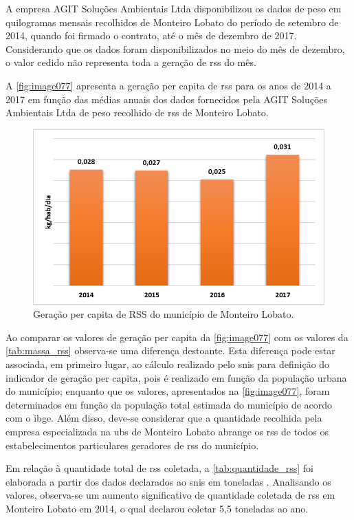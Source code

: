A empresa AGIT Soluções Ambientais Ltda disponibilizou os dados de peso em quilogramas mensais recolhidos de Monteiro Lobato do período de setembro de 2014, quando foi firmado o contrato, até o mês de dezembro de 2017. Considerando que os dados foram disponibilizados no meio do mês de dezembro, o valor cedido não representa toda a geração de \gls{rss} do mês.

A \autoref{fig:image077} apresenta a geração per capita de \gls{rss} para os anos de 2014 a 2017 em função das médias anuais dos dados fornecidos pela AGIT Soluções Ambientais Ltda de peso recolhido de \gls{rss} de Monteiro Lobato.

\begin{figure}
	\centering
	\includegraphics[width=0.75\linewidth]{produtos/prodtres/image077}
	\caption{Geração per capita de RSS do município de Monteiro Lobato.}
	\label{fig:image077}
\end{figure}


Ao comparar os valores de geração per capita da \autoref{fig:image077} com os valores da \autoref{tab:massa_rss} observa-se uma diferença destoante. Esta diferença pode estar associada, em primeiro lugar, ao cálculo realizado pelo \gls{snis} para definição do indicador de geração per capita, pois é realizado em função da população urbana do município; enquanto que os valores, apresentados na \autoref{fig:image077}, foram determinados em função da população total estimada do município de acordo com o \gls{ibge}. Além disso, deve-se considerar que a quantidade recolhida pela empresa especializada na \gls{ubs} de Monteiro Lobato abrange os \gls{rss} de todos os estabelecimentos particulares geradores de \gls{rss} do município. 

Em relação à quantidade total de \gls{rss} coletada, a \autoref{tab:quantidade_rss} foi elaborada a partir dos dados declarados ao \gls{snis} em toneladas \cite{SNIS2016}. Analisando os valores, observa-se um aumento significativo de quantidade coletada de \gls{rss} em Monteiro Lobato em 2014, o qual declarou coletar 5,5 toneladas ao ano.


